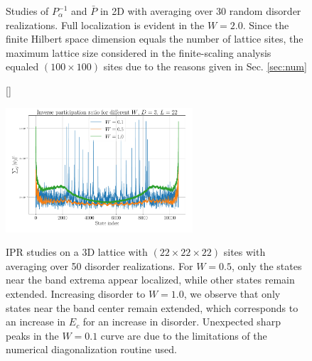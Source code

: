 \documentclass[10pt,a4paper]{article}
\begin{document}
\begin{figure}[H]
\caption{Studies of $P^{-1}_\alpha$ and $\bar{P}$ in 2D with averaging over 30 random disorder realizations. Full localization is evident in the $W=2.0$. Since the finite Hilbert space dimension equals the number of lattice sites, the maximum lattice size considered in the finite-scaling analysis equaled $(100\times100)$ sites due to the reasons given in Sec. \ref{sec:num}}
\label{fig:2D_ipr} 
\end{figure} 
\begin{figure}[H]
[\FBwidth]
{\caption{IPR studies on a 3D lattice with $(22\times22\times22)$ sites with averaging over 50 disorder realizations. For $W=0.5$, only the states near the band extrema appear localized, while other states remain extended. Increasing disorder to $W=1.0$, we observe that only states near the band center remain extended, which corresponds to an increase in $E_c$ for an increase in disorder. Unexpected sharp peaks in the $W=0.1$ curve are due to the limitations of the numerical diagonalization routine used.}\label{fig:3D_ipr}}
{\includegraphics[width=0.62\textwidth]{3D_Anderson_localization_Seminar_scaling_analysis_D3_shape_22_22_22_eigensys_plots_single_presentation.pdf}}
\end{figure}
\end{document}
